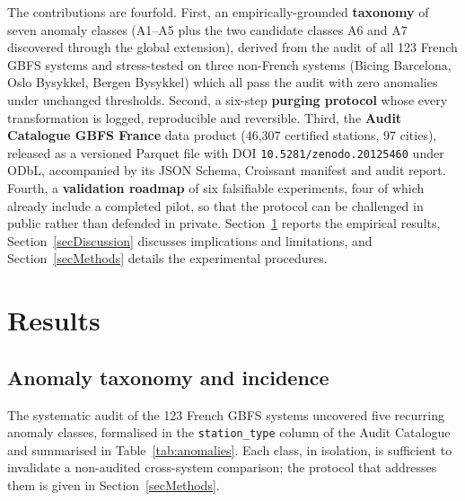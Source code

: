 \documentclass[11pt,a4paper]{article}
\begin{document}
The contributions are fourfold. First, an empirically-grounded
\textbf{taxonomy} of seven anomaly classes (A1--A5 plus the two
candidate classes A6 and A7 discovered through the global extension),
derived from the audit of all 123 French GBFS systems and stress-tested
on three non-French systems (Bicing Barcelona, Oslo Bysykkel, Bergen
Bysykkel) which all pass the audit with zero anomalies under unchanged
thresholds. Second, a
six-step \textbf{purging protocol} whose every transformation is
logged, reproducible and reversible. Third, the \textbf{Audit Catalogue
GBFS France} data product (46{,}307 certified stations, 97 cities),
released as a versioned Parquet file with DOI
\texttt{10.5281/zenodo.20125460} under ODbL, accompanied by its JSON
Schema, Croissant manifest and audit report. Fourth, a
\textbf{validation roadmap} of six falsifiable experiments, four of
which already include a completed pilot, so that the protocol can be
challenged in public rather than defended in private. Section~\ref{secResults} reports the empirical results,
Section~\ref{secDiscussion} discusses implications and limitations, and
Section~\ref{secMethods} details the experimental procedures.

\section{Results}\label{secResults}

\subsection{Anomaly taxonomy and incidence}
The systematic audit of the 123 French GBFS systems uncovered five
recurring anomaly classes, formalised in the \texttt{station\_type}
column of the Audit Catalogue and summarised in
Table~\ref{tab:anomalies}. Each class, in isolation, is sufficient to
invalidate a non-audited cross-system comparison; the protocol that
addresses them is given in Section~\ref{secMethods}.
\end{document}
